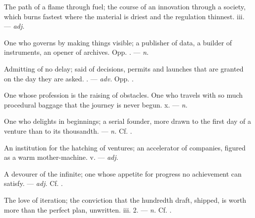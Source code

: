  The path of a flame through fuel;  the course of an innovation through a society, which burns fastest where the material is driest and the regulation thinnest.   iii. ---  \textit{adj.}

 One who governs by making things visible; a publisher of data, a builder of instruments, an opener of archives. Opp. . ---  \textit{n.}

 Admitting of no delay; said of decisions, permits and launches that are granted on the day they are asked. . ---  \textit{adv.} Opp. .

  One whose profession is the raising of obstacles.  One who travels with so much procedural baggage that the journey is never begun.   x. ---  \textit{n.}

 One who delights in beginnings; a serial founder, more drawn to the first day of a venture than to its thousandth. ---  \textit{n.} Cf. .

 An institution for the hatching of ventures; an accelerator of companies, figured as a warm mother-machine.   v. ---  \textit{adj.}

 A devourer of the infinite; one whose appetite for progress no achievement can satisfy. ---  \textit{adj.} Cf. .

 The love of iteration; the conviction that the hundredth draft, shipped, is worth more than the perfect plan, unwritten.   iii. 2. ---  \textit{n.} Cf. .

